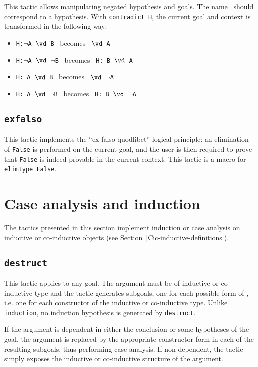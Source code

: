 \begin{coq_example*}
This tactic allows manipulating negated hypothesis and goals. The
name \ident\ should correspond to a hypothesis. With
{\tt contradict H}, the current goal and context is transformed in
the following way:
\begin{itemize}
\item  {\tt H:$\neg$A $\vd$  B} \ becomes \ {\tt $\vd$ A}
\item  {\tt H:$\neg$A $\vd$ $\neg$B} \  becomes \ {\tt H: B $\vd$  A }
\item  {\tt H: A $\vd$  B} \ becomes \ {\tt $\vd$ $\neg$A}
\item  {\tt H: A $\vd$ $\neg$B} \ becomes \ {\tt H: B $\vd$ $\neg$A}
\end{itemize}

\subsection{\tt exfalso}
\label{exfalso}

This tactic implements the ``ex falso quodlibet'' logical principle:
an elimination of {\tt False} is performed on the current goal, and the
user is then required to prove that {\tt False} is indeed provable in
the current context. This tactic is a macro for {\tt elimtype False}.

\section{Case analysis and induction}

The tactics presented in this section implement induction or case
analysis on inductive or co-inductive objects (see
Section~\ref{Cic-inductive-definitions}).

\subsection{\tt destruct \term}
\label{destruct}

This tactic applies to any goal. The argument {\term} must be of
inductive or co-inductive type and the tactic generates subgoals, one
for each possible form of {\term}, i.e. one for each constructor of
the inductive or co-inductive type. Unlike {\tt induction}, no
induction hypothesis is generated by {\tt destruct}.

If the argument is dependent in either the conclusion or some
hypotheses of the goal, the argument is replaced by the appropriate
constructor form in each of the resulting subgoals, thus performing
case analysis. If non-dependent, the tactic simply exposes the
inductive or co-inductive structure of the argument.


\end{coq_example*}
